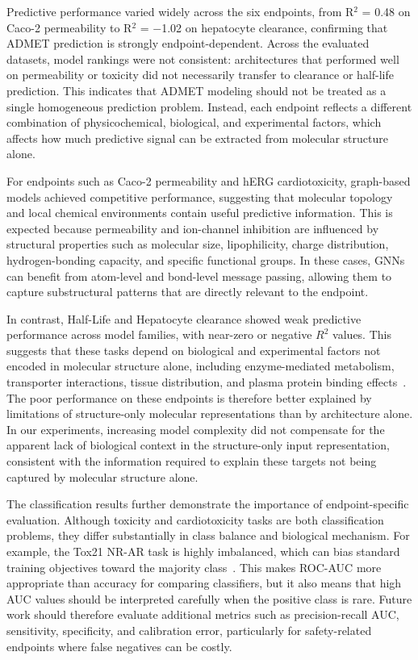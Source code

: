 \documentclass[journal]{IEEEtran}
\begin{document}
Predictive performance varied widely across the six endpoints, from R$^2$ = 0.48 on Caco-2 permeability to R$^2$ = $-$1.02 on hepatocyte clearance, confirming that ADMET prediction is strongly endpoint-dependent.
Across the evaluated datasets, model rankings were not consistent: architectures that performed well on permeability or toxicity did not necessarily transfer to clearance or half-life prediction.
This indicates that ADMET modeling should not be treated as a single homogeneous prediction problem.
Instead, each endpoint reflects a different combination of physicochemical, biological, and experimental factors, which affects how much predictive signal can be extracted from molecular structure alone.

For endpoints such as Caco-2 permeability and hERG cardiotoxicity, graph-based models achieved competitive performance, suggesting that molecular topology and local chemical environments contain useful predictive information.
This is expected because permeability and ion-channel inhibition are influenced by structural properties such as molecular size, lipophilicity, charge distribution, hydrogen-bonding capacity, and specific functional groups.
In these cases, GNNs can benefit from atom-level and bond-level message passing, allowing them to capture substructural patterns that are directly relevant to the endpoint.

In contrast, Half-Life and Hepatocyte clearance showed weak predictive performance across model families, with near-zero or negative \(R^2\) values.
This suggests that these tasks depend on biological and experimental factors not encoded in molecular structure alone, including enzyme-mediated metabolism, transporter interactions, tissue distribution, and plasma protein binding effects~\cite{li2019dmpk,lai2022dmpk,bohnert2013proteinbinding}.
The poor performance on these endpoints is therefore better explained by limitations of structure-only molecular representations than by architecture alone.
In our experiments, increasing model complexity did not compensate for the apparent lack of biological context in the structure-only input representation, consistent with the information required to explain these targets not being captured by molecular structure alone.

The classification results further demonstrate the importance of endpoint-specific evaluation.
Although toxicity and cardiotoxicity tasks are both classification problems, they differ substantially in class balance and biological mechanism.
For example, the Tox21 NR-AR task is highly imbalanced, which can bias standard training objectives toward the majority class~\cite{he2009imbalanced}.
This makes ROC-AUC more appropriate than accuracy for comparing classifiers, but it also means that high AUC values should be interpreted carefully when the positive class is rare.
Future work should therefore evaluate additional metrics such as precision-recall AUC, sensitivity, specificity, and calibration error, particularly for safety-related endpoints where false negatives can be costly.
\end{document}
